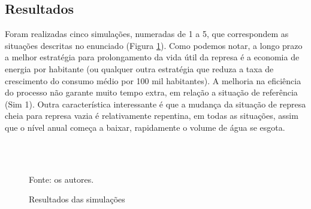 \documentclass{article}
\begin{document}
\subsection*{Resultados}


Foram realizadas cinco simulações, numeradas de 1 a 5, que correspondem as situações descritas no enunciado (Figura \ref{fig:resultados}). Como podemos notar, a longo prazo a melhor estratégia para prolongamento da vida útil da represa é a economia de energia por habitante (ou qualquer outra estratégia que reduza a taxa de crescimento do consumo médio por 100 mil habitantes). A melhoria na eficiência do processo não garante muito tempo extra, em relação a situação de referência (Sim 1). Outra característica interessante é que a mudança da situação de represa cheia para represa vazia é relativamente repentina, em todas as situações, assim que o nível anual começa a baixar, rapidamente o volume de água se esgota.

\begin{figure}[ht!]
    \centering
    \caption{Resultados das simulações}
    \label{fig:resultados}
    \\
    \\
    {\flushleft Fonte: os autores. \par}
\end{figure}
\end{document}
